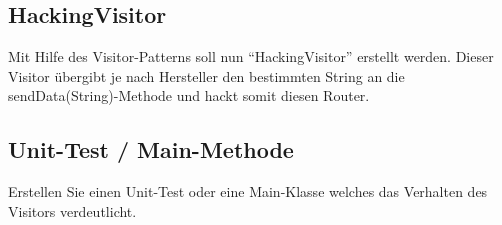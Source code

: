 \documentclass[oneside,a4paper]{scrartcl}
\begin{document}
\subsection{HackingVisitor}

Mit Hilfe des Visitor-Patterns soll nun \enquote{HackingVisitor} erstellt werden.
Dieser Visitor übergibt je nach Hersteller den bestimmten String an die sendData(String)-Methode und
hackt somit diesen Router.


\subsection{Unit-Test / Main-Methode}
Erstellen Sie einen Unit-Test oder eine Main-Klasse welches das Verhalten des Visitors verdeutlicht.
\end{document}
